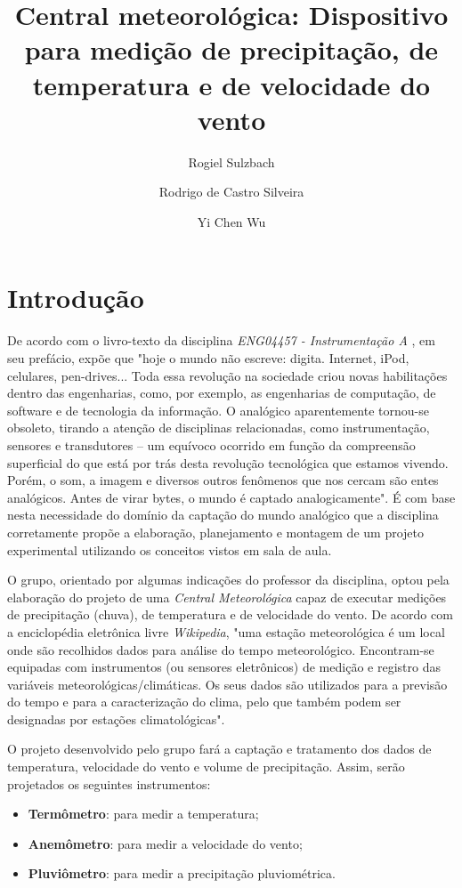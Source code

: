 \documentclass[12pt,a4paper]{instrumentacao}
\title{Central meteorológica: Dispositivo para medição de precipitação, de temperatura e de velocidade do vento}
\author{Rogiel Sulzbach \and Rodrigo de Castro Silveira \and Yi Chen Wu}
\institute{Universidade Federal do Rio Grande do Sul, Departamento de Engenharia Elétrica, Curso de Engenharia Elétrica, Instrumentação A, Profs. Dr. Alexandre Balbinot e Dra. Léia Bagesteiro}
\begin{document}
\maketitle


\chapter{Introdução}
De acordo com o livro-texto da disciplina \textit{ENG04457 - Instrumentação A} \cite{livro-texto}, em seu prefácio, expõe que "hoje o mundo não escreve: digita. Internet, iPod, celulares, pen-drives... Toda essa revolução na sociedade criou novas habilitações dentro das engenharias, como, por exemplo, as engenharias de computação, de software e de tecnologia da informação. O analógico aparentemente tornou-se obsoleto, tirando a atenção de disciplinas relacionadas, como instrumentação, sensores e transdutores -- um equívoco ocorrido em função da compreensão superficial do que está por trás desta revolução tecnológica que estamos vivendo. Porém, o som, a imagem e diversos outros fenômenos que nos cercam são entes analógicos. Antes de virar bytes, o mundo é captado analogicamente". É com base nesta necessidade do domínio da captação do mundo analógico que a disciplina corretamente propõe a elaboração, planejamento e montagem de um projeto experimental utilizando os conceitos vistos em sala de aula.

O grupo, orientado por algumas indicações do professor da disciplina, optou pela elaboração do projeto de uma \textit{Central Meteorológica} capaz de executar medições de precipitação (chuva), de temperatura e de velocidade do vento. De acordo com a enciclopédia eletrônica livre \textit{Wikipedia}\cite{estacao}, "uma estação meteorológica é um local onde são recolhidos dados para análise do tempo meteorológico. Encontram-se equipadas com instrumentos (ou sensores eletrônicos) de medição e registro das variáveis meteorológicas/climáticas. Os seus dados são utilizados para a previsão do tempo e para a caracterização do clima, pelo que também podem ser designadas por estações climatológicas".

O projeto desenvolvido pelo grupo fará a captação e tratamento dos dados de temperatura, velocidade do vento e volume de precipitação. Assim, serão projetados os seguintes instrumentos:

\begin{itemize}
	\item \textbf{Termômetro}: para medir a temperatura;
	\item \textbf{Anemômetro}: para medir a velocidade do vento;
	\item \textbf{Pluviômetro}: para medir a precipitação pluviométrica.
\end{itemize}
\end{document}
